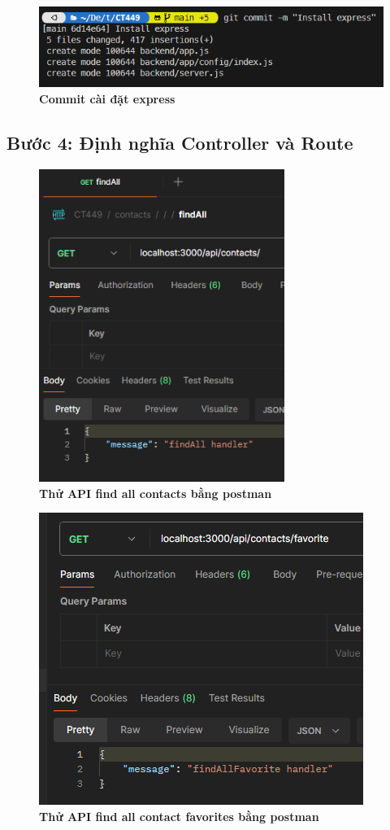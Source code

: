 \begin{figure}[H]
  \centering
  \includegraphics{images/chapterFirst/12.png}
  \caption{\bfseries Commit cài đặt express}
\end{figure}
\subsection*{Bước 4: Định nghĩa Controller và Route}
\setcounter{subsection}{4}
\setcounter{figure}{0}
\begin{figure}[H]
  \centering
  \includegraphics[width=8cm]{images/chapterFirst/13.png}
  \caption{\bfseries Thử API find all contacts bằng postman}
\end{figure}
\begin{figure}[H]
  \centering
  \includegraphics{images/chapterFirst/14.png}
  \caption{\bfseries Thử API find all contact favorites bằng postman}
\end{figure}

